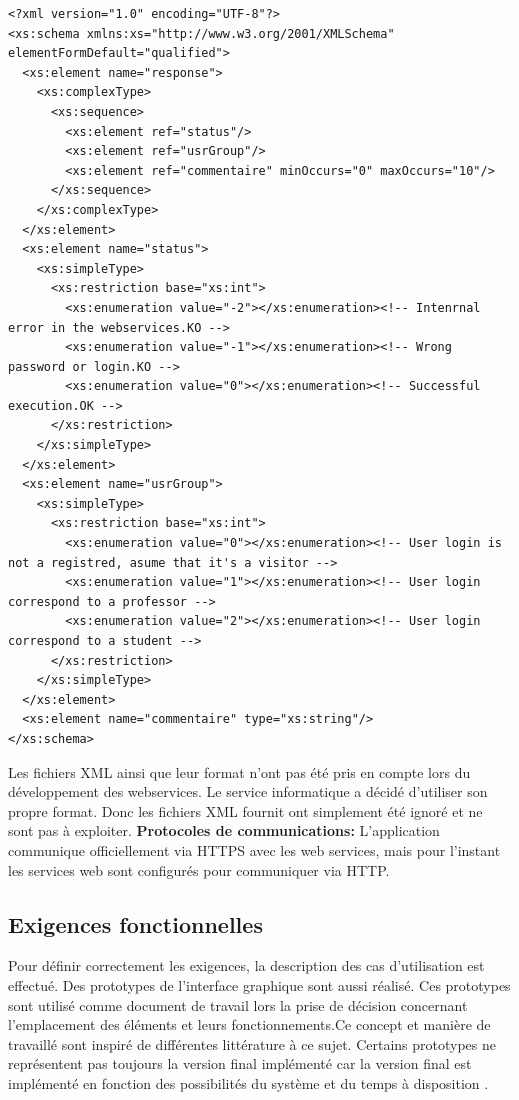  \begin{lstlisting}[language=XSD,caption = Exemple de XML Schema fournit au service informatique de l'USJ]
<?xml version="1.0" encoding="UTF-8"?>
<xs:schema xmlns:xs="http://www.w3.org/2001/XMLSchema" elementFormDefault="qualified">
  <xs:element name="response">
    <xs:complexType>
      <xs:sequence>
        <xs:element ref="status"/>
        <xs:element ref="usrGroup"/>
        <xs:element ref="commentaire" minOccurs="0" maxOccurs="10"/>
      </xs:sequence>
    </xs:complexType>
  </xs:element>
  <xs:element name="status">
    <xs:simpleType>
      <xs:restriction base="xs:int">
        <xs:enumeration value="-2"></xs:enumeration><!-- Intenrnal error in the webservices.KO -->
        <xs:enumeration value="-1"></xs:enumeration><!-- Wrong password or login.KO -->
        <xs:enumeration value="0"></xs:enumeration><!-- Successful execution.OK -->
      </xs:restriction>
    </xs:simpleType>
  </xs:element>
  <xs:element name="usrGroup">
    <xs:simpleType>
      <xs:restriction base="xs:int">
        <xs:enumeration value="0"></xs:enumeration><!-- User login is not a registred, asume that it's a visitor -->
        <xs:enumeration value="1"></xs:enumeration><!-- User login correspond to a professor -->
        <xs:enumeration value="2"></xs:enumeration><!-- User login correspond to a student -->
      </xs:restriction>
    </xs:simpleType>
  </xs:element>
  <xs:element name="commentaire" type="xs:string"/>
</xs:schema>
			\end{lstlisting}
	Les fichiers XML ainsi que leur format n'ont pas été pris en compte lors du développement des webservices. Le service informatique a décidé d'utiliser son propre format. Donc les fichiers XML fournit ont simplement été ignoré et ne sont pas à exploiter.   
	\textbf{Protocoles de communications:} L'application communique officiellement via HTTPS avec les web services, mais pour l'instant les services web sont configurés pour communiquer via HTTP. \\[0.2cm]
	
	
	
	\subsection{Exigences fonctionnelles \label{exigenceFoction}}
		Pour définir correctement les exigences, la description des cas d'utilisation est effectué. Des prototypes de l'interface graphique sont aussi réalisé. Ces prototypes sont utilisé comme document de travail lors la prise de décision concernant l'emplacement des éléments et leurs fonctionnements.Ce concept et manière de travaillé sont inspiré de différentes littérature à ce sujet\cite{bookErgo}.   Certains prototypes ne représentent pas toujours la version final implémenté car la version final est implémenté en fonction des possibilités du système et du temps à disposition . 
		
